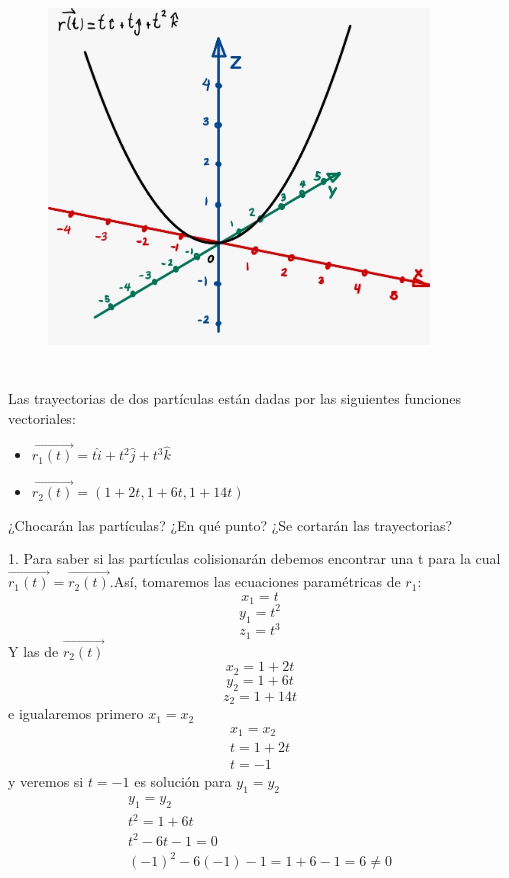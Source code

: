 \documentclass[12pt]{article}
\begin{document}
  \begin{figure}[H]
    \centering
    \includegraphics[width=0.9\textwidth]{./img/t2_ej5_curva.jpeg}
  \end{figure}

\section{}
Las trayectorias de dos partículas están dadas por las siguientes funciones vectoriales:
\begin{itemize}[format=\textbf]

\item $\vec{r_1(t)}=t\hat{i}+t^2\hat{j}+t^3\hat{k}$

\item $\vec{r_2(t)}=(1+2t,1+6t,1+14t)$

\end{itemize}
¿Chocarán las partículas? ¿En qué punto? ¿Se cortarán las trayectorias?

1. Para saber si las partículas colisionarán debemos encontrar una t para la cual $\vec{r_1(t)} = \vec{r_2(t)}$.Así, tomaremos las ecuaciones paramétricas de $r_1$:
\[ x_1 = t\]
\[ y_1 = t^2\]
\[ z_1 = t^3\]
Y las de $\vec{r_2(t)}$
\[ x_2 = 1+2t\]
\[ y_2 = 1+6t\]
\[ z_2 = 1+14t\]
e igualaremos primero $x_1 = x_2$
 \begin{align*}
   x_1 = x_2 \\
   t = 1+2t \\
   t=-1
 \end{align*}
 y veremos si $t=-1$ es solución para $y_1 = y_2$
 \begin{align*}
   y_1 = y_2 \\
   t^2 =  1+6t \\
   t^2 -6t -1 = 0 \\
   (-1)^2 - 6 (-1) -1 = 1 +6 -1 = 6 \neq 0
 \end{align*}
\end{document}
